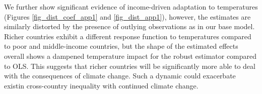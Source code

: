 \documentclass[11pt, letterpaper]{article}
\numberwithin{algorithm}{section}
\numberwithin{assumption}{section}
\numberwithin{lemma}{section}
\numberwithin{theorem}{section}
\numberwithin{corollary}{section}
\numberwithin{remark}{section}
\numberwithin{equation}{section}
\numberwithin{figure}{section}
\numberwithin{table}{section}
\begin{document}



We further show significant evidence of income-driven adaptation to temperatures (Figures \ref{fig_dist_coef_app1} and \ref{fig_dist_app1}), however, the estimates are similarly distorted by the presence of outlying observations as in our base model. Richer countries exhibit a different response function to temperatures compared to poor and middle-income countries, but the shape of the estimated effects overall shows a dampened temperature impact for the robust estimator compared to OLS. This suggests that richer countries will be significantly more able to deal with the consequences of climate change. Such a dynamic could exacerbate existin cross-country inequality with continued climate change.
\end{document}
